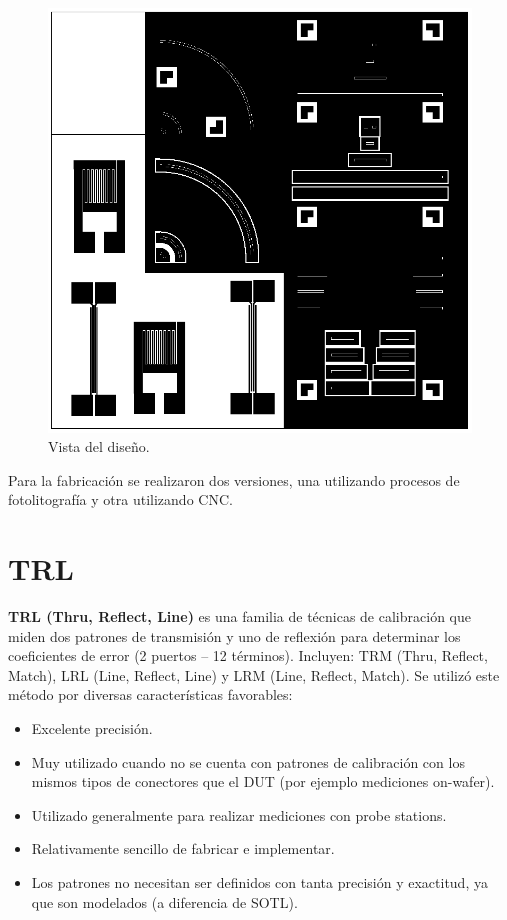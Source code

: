 \documentclass[10pt, a4paper, twocolumn]{article}
\begin{document}
\begin{figure}[hbt!]
	\includegraphics[width=\linewidth]{Fotos/pcb.png}
	\caption{Vista del diseño.}
\end{figure}

Para la fabricación se realizaron dos versiones, una utilizando procesos de fotolitografía
y otra utilizando CNC.

\section{TRL}
\textbf{TRL (Thru, Reflect, Line)} es una familia de técnicas de calibración que
miden dos patrones de transmisión y uno de reflexión para determinar los
coeficientes de error (2 puertos – 12 términos). Incluyen: TRM (Thru, Reflect, Match), LRL (Line, Reflect, Line) y LRM (Line, Reflect, Match). Se utilizó este método por diversas
características favorables:
\begin{itemize}
\item Excelente precisión.
\item Muy utilizado cuando no se cuenta con patrones de calibración con los mismos tipos de conectores que el DUT (por ejemplo mediciones on-wafer).
\item Utilizado generalmente para realizar mediciones con probe stations.
\item Relativamente sencillo de fabricar e implementar.
\item Los patrones no necesitan ser definidos con tanta precisión y exactitud, ya que son modelados (a diferencia de SOTL).
\end{itemize}
\end{document}
